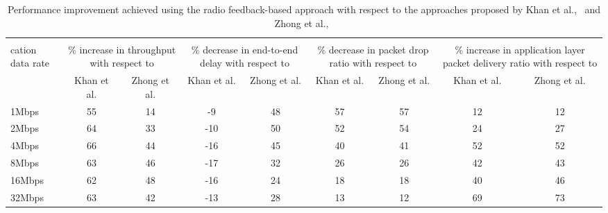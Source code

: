 \begin{table}[!htb]
	\centering
    \caption{Performance improvement achieved using the radio feedback-based approach with respect to the approaches proposed by Khan et al.,~\cite{khan2015towards} and Zhong et al.,~\cite{zhong2014capacity}}
  \label{tab:topology4RadioImprovement}
  \renewcommand\multirowsetup{\centering}
    \begin{tabular}{|>{\centering} p{}|c|c|c|c|c|c|c|c|}
    \hline
    \multirow{2}{0.05\textwidth}{\newline \newline \newline Appli-\\cation data rate} & \multicolumn{2}{|p{0.08\textwidth}|}{\centering\% increase in throughput with respect to} & \multicolumn{2}{|p{0.08\textwidth}|}{\centering\% decrease in end-to-end delay with respect to} & \multicolumn{2}{|p{0.08\textwidth}|}{\centering\% decrease in packet drop ratio with respect to} & \multicolumn{2}{|p{0.08\textwidth}|}{\centering\% increase in application layer packet delivery ratio with respect to}\\
    \cline{2-9}
          & \multicolumn{1}{|p{0.025\textwidth}|}{\centering Khan et al.} & \multicolumn{1}{|p{0.025\textwidth}|}{\centering Zhong et al.} & \multicolumn{1}{|p{0.025\textwidth}|}{\centering Khan et al.} & \multicolumn{1}{|p{0.025\textwidth}|}{\centering Zhong et al.} & \multicolumn{1}{|p{0.03\textwidth}|}{\centering Khan et al.} & \multicolumn{1}{|p{0.025\textwidth}|}{\centering Zhong et al.} & \multicolumn{1}{|p{0.025\textwidth}|}{\centering Khan et al.} & \multicolumn{1}{|p{0.025\textwidth}|}{\centering Zhong et al.}\\
    \hline
    1Mbps & 55 & 14 & -9 & 48 & 57 & 57 & 12 & 12 \\\hline
    2Mbps & 64 & 33 & -10 & 50 & 52 & 54 & 24 & 27 \\\hline
    4Mbps & 66 & 44 & -16 & 45 & 40 & 41 & 52 & 52 \\\hline
    8Mbps & 63 & 46 & -17 & 32 & 26 & 26 & 42 & 43 \\\hline
    16Mbps & 62 & 48 & -16 & 24 & 18 & 18 & 40 & 46 \\\hline
    32Mbps & 63 & 42 & -13 & 28 & 13 & 12 & 69 & 73 \\\hline
    \end{tabular}%
\end{table}

